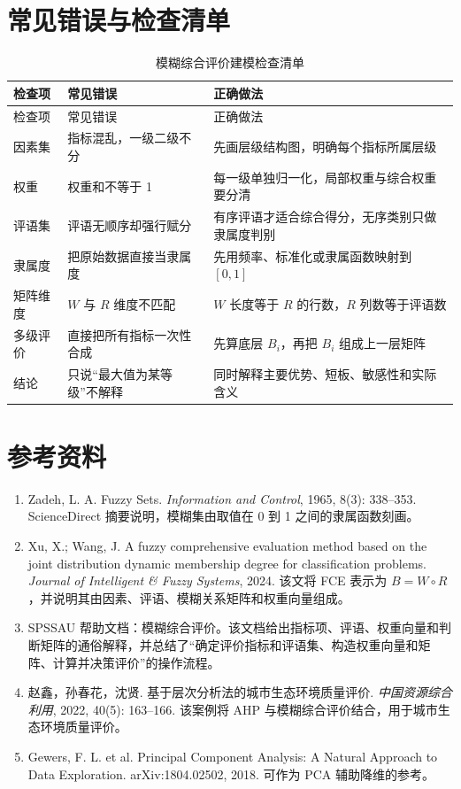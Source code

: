 \documentclass[UTF8,zihao=-4,fontset=none]{ctexart}
\begin{document}
\section{常见错误与检查清单}
\begin{longtable}{p{}p{}p{}}
\caption{模糊综合评价建模检查清单}\label{tab:check}\\
\toprule
检查项 & 常见错误 & 正确做法\\
\midrule
\endfirsthead
\toprule
检查项 & 常见错误 & 正确做法\\
\midrule
\endhead
因素集 & 指标混乱，一级二级不分 & 先画层级结构图，明确每个指标所属层级\\
权重 & 权重和不等于 1 & 每一级单独归一化，局部权重与综合权重要分清\\
评语集 & 评语无顺序却强行赋分 & 有序评语才适合综合得分，无序类别只做隶属度判别\\
隶属度 & 把原始数据直接当隶属度 & 先用频率、标准化或隶属函数映射到 $[0,1]$\\
矩阵维度 & $W$ 与 $R$ 维度不匹配 & $W$ 长度等于 $R$ 的行数，$R$ 列数等于评语数\\
多级评价 & 直接把所有指标一次性合成 & 先算底层 $B_i$，再把 $B_i$ 组成上一层矩阵\\
结论 & 只说“最大值为某等级”不解释 & 同时解释主要优势、短板、敏感性和实际含义\\
\bottomrule
\end{longtable}

\section{参考资料}
\begin{enumerate}[leftmargin=2.2em]
  \item Zadeh, L. A. Fuzzy Sets. \textit{Information and Control}, 1965, 8(3): 338--353. ScienceDirect 摘要说明，模糊集由取值在 0 到 1 之间的隶属函数刻画。
  \item Xu, X.; Wang, J. A fuzzy comprehensive evaluation method based on the joint distribution dynamic membership degree for classification problems. \textit{Journal of Intelligent \& Fuzzy Systems}, 2024. 该文将 FCE 表示为 $B=W\circ R$，并说明其由因素、评语、模糊关系矩阵和权重向量组成。
  \item SPSSAU 帮助文档：模糊综合评价。该文档给出指标项、评语、权重向量和判断矩阵的通俗解释，并总结了“确定评价指标和评语集、构造权重向量和矩阵、计算并决策评价”的操作流程。
  \item 赵鑫，孙春花，沈贤. 基于层次分析法的城市生态环境质量评价. \textit{中国资源综合利用}, 2022, 40(5): 163--166. 该案例将 AHP 与模糊综合评价结合，用于城市生态环境质量评价。
  \item Gewers, F. L. et al. Principal Component Analysis: A Natural Approach to Data Exploration. arXiv:1804.02502, 2018. 可作为 PCA 辅助降维的参考。
\end{enumerate}
\end{document}
